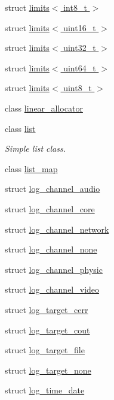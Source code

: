 \begin{DoxyCompactItemize}
\item 
struct \hyperlink{structcrap_1_1limits_3_01int8__t_01_4}{limits$<$ int8\+\_\+t $>$}
\item 
struct \hyperlink{structcrap_1_1limits_3_01uint16__t_01_4}{limits$<$ uint16\+\_\+t $>$}
\item 
struct \hyperlink{structcrap_1_1limits_3_01uint32__t_01_4}{limits$<$ uint32\+\_\+t $>$}
\item 
struct \hyperlink{structcrap_1_1limits_3_01uint64__t_01_4}{limits$<$ uint64\+\_\+t $>$}
\item 
struct \hyperlink{structcrap_1_1limits_3_01uint8__t_01_4}{limits$<$ uint8\+\_\+t $>$}
\item 
class \hyperlink{classcrap_1_1linear__allocator}{linear\+\_\+allocator}
\item 
class \hyperlink{classcrap_1_1list}{list}
\begin{DoxyCompactList}\small\item\em Simple list class. \end{DoxyCompactList}\item 
class \hyperlink{classcrap_1_1list__map}{list\+\_\+map}
\item 
struct \hyperlink{structcrap_1_1log__channel__audio}{log\+\_\+channel\+\_\+audio}
\item 
struct \hyperlink{structcrap_1_1log__channel__core}{log\+\_\+channel\+\_\+core}
\item 
struct \hyperlink{structcrap_1_1log__channel__network}{log\+\_\+channel\+\_\+network}
\item 
struct \hyperlink{structcrap_1_1log__channel__none}{log\+\_\+channel\+\_\+none}
\item 
struct \hyperlink{structcrap_1_1log__channel__physic}{log\+\_\+channel\+\_\+physic}
\item 
struct \hyperlink{structcrap_1_1log__channel__video}{log\+\_\+channel\+\_\+video}
\item 
struct \hyperlink{structcrap_1_1log__target__cerr}{log\+\_\+target\+\_\+cerr}
\item 
struct \hyperlink{structcrap_1_1log__target__cout}{log\+\_\+target\+\_\+cout}
\item 
struct \hyperlink{structcrap_1_1log__target__file}{log\+\_\+target\+\_\+file}
\item 
struct \hyperlink{structcrap_1_1log__target__none}{log\+\_\+target\+\_\+none}
\item 
struct \hyperlink{structcrap_1_1log__time__date}{log\+\_\+time\+\_\+date}
\item 

\end{DoxyCompactItemize}
